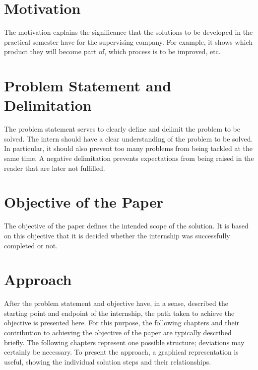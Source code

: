 \documentclass[oneside]{ausarbeitung}
\begin{document}
\section{Motivation}
\label{sec:motivation}

The motivation explains the significance that the solutions to be developed
in the practical semester have for the supervising company.
For example, it shows which product they will become part of,
which process is to be improved, etc.

\section{Problem Statement and Delimitation}
\label{sec:problemstellung}

The problem statement serves to clearly define and delimit the problem to be solved.
The intern should have a clear understanding of the problem to be solved.
In particular, it should also prevent too many problems from being tackled at the same time.
A negative delimitation prevents expectations from being raised in the reader
that are later not fulfilled.

\section{Objective of the Paper}
\label{sec:ziel}

The objective of the paper defines the intended scope of the solution. It is based on this objective that it is decided whether the internship was successfully completed or not.

\section{Approach}
\label{sec:vorgehen}

After the problem statement and objective have, in a sense, described the starting point and endpoint
of the internship, the path taken to achieve the objective is presented here.
For this purpose, the following chapters and their contribution to achieving the objective of the paper
are typically described briefly. The following chapters represent one possible structure;
deviations may certainly be necessary. To present the approach, a graphical representation is useful,
showing the individual solution steps and their relationships.

\end{document}
